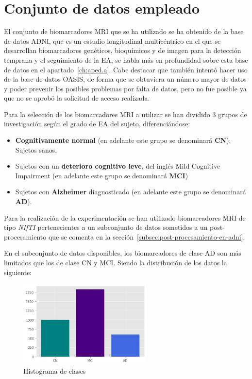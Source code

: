\section{Conjunto de datos empleado}\label{sec:conjunto-de-datos-empleado}
El conjunto de biomarcadores MRI que se ha utilizado se ha obtenido de la base de datos ADNI, que es un estudio
longitudinal multicéntrico en el que se desarrollan biomarcadores genéticos, bioquímicos y de imagen para la detección
temprana y el seguimiento de la EA, se habla más en profundidad sobre esta base de datos en el
apartado~\ref{ch:aped.a}.
Cabe destacar que también intentó hacer uso de la base de datos OASIS, de forma que se obtuviera un número mayor de
datos y poder prevenir los posibles problemas por falta de datos, pero no fue posible ya que no se aprobó la solicitud
de acceso realizada.

Para la selección de los biomarcadores MRI a utilizar se han dividido 3 grupos de investigación según el grado de EA
del sujeto, diferenciándose:
\begin{itemize}
    \item \textbf{Cognitivamente normal} (en adelante este grupo se denominará \textbf{CN}): Sujetos sanos.
    \item Sujetos con un \textbf{deterioro cognitivo leve}, del inglés Mild Cognitive Impairment (en adelante este grupo
    se denominará \textbf{MCI})
    \item Sujetos con \textbf{Alzheimer} diagnosticado (en adelante este grupo se denominará \textbf{AD}). \\
\end{itemize}

Para la realización de la experimentación se han utilizado biomarcadores MRI de tipo \textit{NIfTI} pertenecientes a un
subconjunto de datos sometidos a un post-procesamiento que se comenta en la sección~\ref{subsec:post-procesamiento-en-adni}.

En el subconjunto de datos disponibles, los biomarcadores de clase AD son más limitados que los de clase CN y MCI.
Siendo la distribución de los datos la siguiente:

\begin{figure}[H]
    \centering
    \includegraphics[width=0.6\textwidth]{./imgs/histograma-de-clases}
    \caption{Histograma de clases}
    \label{fig:histograma-de-clases}
\end{figure}

